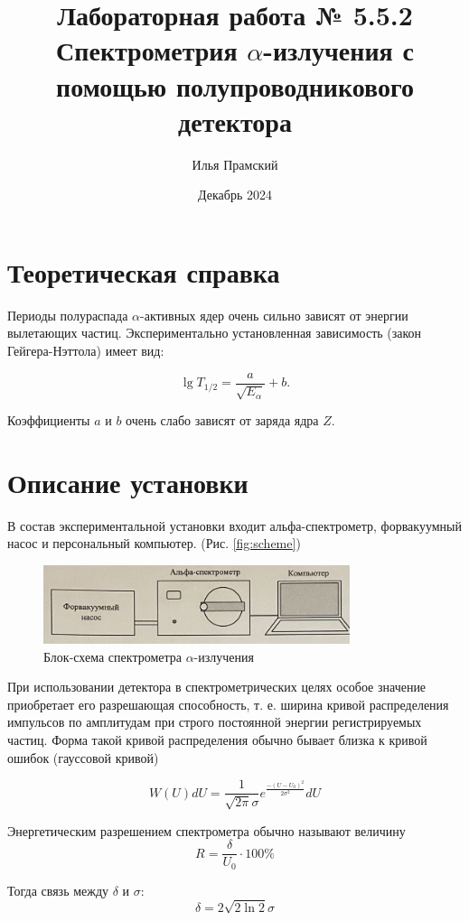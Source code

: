 \documentclass[a4paper,12pt]{article}
\title{Лабораторная работа № 5.5.2\\Спектрометрия $\alpha$-излучения с помощью полупроводникового детектора}
\author{Илья Прамский}
\date{Декабрь 2024}
\begin{document}
\maketitle
\newpage
\section{Теоретическая справка}

Периоды полураспада $\alpha$-активных ядер очень сильно зависят от энергии вылетающих частиц. Экспериментально установленная зависимость (закон Гейгера-Нэттола) имеет вид:

\begin{equation}\label{eq:gey_net}
\lg T_{1 / 2}=\frac{a}{\sqrt{E_\alpha}}+b .
\end{equation}

Коэффициенты $a$ и $b$ очень слабо зависят от заряда ядра $Z$.

\section*{Описание установки}
В состав экспериментальной установки входит альфа-спектрометр, форвакуумный насос и персональный компьютер. (Рис. \ref{fig:scheme})

\begin{figure}[H]
  \centering
  \includegraphics[width=0.8\textwidth]{scheme1.png}  \caption{Блок-схема спектрометра $\alpha$-излучения}
\end{figure}

При использовании детектора в спектрометрических целях особое значение приобретает его разрешающая способность, т. е. ширина кривой распределения импульсов по амплитудам при строго постоянной энергии регистрируемых частиц. Форма такой кривой распределения обычно бывает близка к кривой ошибок (гауссовой кривой)

\[W(U)dU = \frac{1}{\sqrt{2 \pi} \sigma} e^{\frac{-{(U-U_0)}^2}{2 \sigma^2}} dU\]

Энергетическим разрешением спектрометра обычно называют величину
\[R = \frac{\delta}{U_0} \cdot 100\%\]

Тогда связь между $\delta$ и $\sigma$:
\[\delta = 2\sqrt{2\ln 2} \sigma\]
\end{document}

